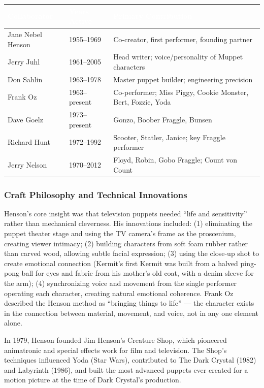 \documentclass[11pt,letterpaper]{article}
\newcommand{\tableheader}[1]{\textbf{\sffamily\textcolor{white}{#1}}}
\begin{document}
\begin{center}
\begin{tabularx}{\textwidth}{L{3.5cm}L{2.5cm}X}
\toprule
{}
\tableheader{Collaborator} & \tableheader{Years Active} & \tableheader{Primary Contribution} \\
\midrule
Jane Nebel Henson & 1955--1969 & Co-creator, first performer, founding partner \\
Jerry Juhl & 1961--2005 & Head writer; voice/personality of Muppet characters \\
Don Sahlin & 1963--1978 & Master puppet builder; engineering precision \\
Frank Oz & 1963--present & Co-performer; Miss Piggy, Cookie Monster, Bert, Fozzie, Yoda \\
Dave Goelz & 1973--present & Gonzo, Boober Fraggle, Bunsen \\
Richard Hunt & 1972--1992 & Scooter, Statler, Janice; key Fraggle performer \\
Jerry Nelson & 1970--2012 & Floyd, Robin, Gobo Fraggle; Count von Count \\
\bottomrule
\end{tabularx}
\end{center}

\subsubsection{Craft Philosophy and Technical Innovations}

Henson's core insight was that television puppets needed ``life and sensitivity'' rather than mechanical cleverness. His innovations included: (1) eliminating the puppet theater stage and using the TV camera's frame as the proscenium, creating viewer intimacy; (2) building characters from soft foam rubber rather than carved wood, allowing subtle facial expression; (3) using the close-up shot to create emotional connection (Kermit's first Kermit was built from a halved ping-pong ball for eyes and fabric from his mother's old coat, with a denim sleeve for the arm); (4) synchronizing voice and movement from the single performer operating each character, creating natural emotional coherence. Frank Oz described the Henson method as ``bringing things to life'' --- the character exists in the connection between material, movement, and voice, not in any one element alone.

In 1979, Henson founded Jim Henson's Creature Shop, which pioneered animatronic and special effects work for film and television. The Shop's techniques influenced Yoda (Star Wars), contributed to The Dark Crystal (1982) and Labyrinth (1986), and built the most advanced puppets ever created for a motion picture at the time of Dark Crystal's production.
\end{document}
